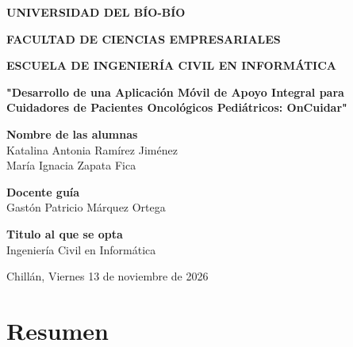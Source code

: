 \documentclass[11pt,letterpaper]{report}
\newcommand{\facultad}{UNIVERSIDAD DEL BÍO-BÍO}
\newcommand{\departamento}{FACULTAD DE CIENCIAS EMPRESARIALES}
\newcommand{\carrera}{ESCUELA DE INGENIERÍA CIVIL EN INFORMÁTICA}
\newcommand{\tituloProyecto}{"Desarrollo de una Aplicación Móvil de Apoyo Integral para Cuidadores de Pacientes Oncológicos Pediátricos: OnCuidar"}
\newcommand{\primeraEstudiante}{Katalina Antonia Ramírez Jiménez}
\newcommand{\segundaEstudiante}{María Ignacia Zapata Fica}
\newcommand{\docente}{Gastón Patricio Márquez Ortega}
\newcommand{\ciudad}{Chillán}
\newcommand{\titulo}{Ingeniería Civil en Informática}
\newcommand{\fechaProyecto}{Viernes 13 de noviembre de 2026}
\begin{document}
\hypersetup{pageanchor=false}
\begin{titlepage}
    \thispagestyle{empty}
    \centering

    \vspace*{-0.8cm}


    {\small \textbf{\facultad}\par}
    {\small \textbf{\departamento}\par}
    {\small \textbf{\carrera}\par}

    \vspace{3cm}

    {\Large \textbf{\tituloProyecto}\par}

    \vspace{3cm}

    \begin{center}
        \textbf{Nombre de las alumnas}\\
        \primeraEstudiante\\
        \segundaEstudiante

        \vspace{0.45cm}

        \textbf{Docente guía}\\
        \docente

        \vspace{0.45cm}

        \textbf{Titulo al que se opta}\\
        \titulo
    \end{center}

    \vfill

    \ciudad, \fechaProyecto

\end{titlepage}

\clearpage
\hypersetup{pageanchor=true}

\chapter*{Resumen}
\end{document}
